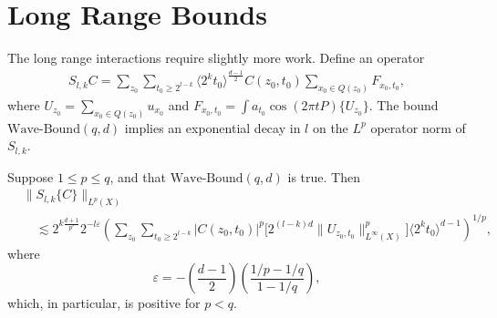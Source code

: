\section{Long Range Bounds}

The long range interactions require slightly more work. Define an operator
%
\begin{align*}
    S_{l,k} C = \sum\nolimits_{z_0} \sum\nolimits_{t_0 \geq 2^{l-k}} \langle 2^k t_0 \rangle^{\frac{d-1}{2}} C(z_0,t_0) \sum\nolimits_{x_0 \in Q(z_0)} F_{x_0,t_0},
\end{align*}
%
where $U_{z_0} = \sum_{x_0 \in Q(z_0)} u_{x_0}$ and $F_{x_0,t_0} = \int a_{t_0} \cos(2 \pi t P) \{ U_{z_0} \}$. The bound $\text{Wave-Bound}(q,d)$ implies an exponential decay in $l$ on the $L^p$ operator norm of $S_{l,k}$.

\begin{lemma} \label{lemma:scaleupbound}
    Suppose $1 \leq p \leq q$, and that $\text{Wave-Bound}(q,d)$ is true. Then
    \begin{align*}
        &\| S_{l,k} \{ C \} \|_{L^p(X)}\\
        &\quad \lesssim 2^{k \frac{d+1}{p'}} 2^{- l \varepsilon} \left( \sum\nolimits_{z_0} \sum\nolimits_{t_0 \geq 2^{l-k}} |C(z_0,t_0)|^p \big[ 2^{(l-k)d} \| U_{z_0,t_0} \|_{L^\infty(X)}^p \big] \langle 2^k t_0 \rangle^{d-1} \right)^{1/p},
    \end{align*}
    where
    \[ \varepsilon = - \left( \frac{d-1}{2} \right) \left( \frac{1/p - 1/q}{1 - 1/q} \right), \]
    which, in particular, is positive for $p < q$.
\end{lemma}
